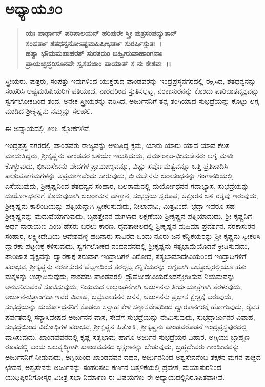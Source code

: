 \section*{ಅಧ್ಯಾಯ\enginline{-}೨೦}

\begin{verse}
\textbf{ಯಃ ಪಾರ್ಥಾನ್ ಪರಿಪಾಲಯನ್ ಹರಿಪುರೇ ಸ್ತ್ರೀ ಪುತ್ರಸಂಪದ್ಯುತಾನ್}\\\textbf{ಸಂಹರ್ತಾ ಶತಧನ್ವನೋಽಷ್ಟಮಹಿಷೀಭರ್ತಾ ಸುರರ್ಷಿಸ್ತುತಃ~।}\\\textbf{ಹತ್ವಾ ಭೌಮಮಪಾಹರತ್ ಸುರತರುಂ ಬಹ್ವೀರುವಾಹಾಂಗನಾಃ }\\\textbf{ಪ್ರಾಯಚ್ಛದ್ಧರಿಸೂನವೇ ಸ್ವಸಹಜಾಂ ಪಾಯಾತ್ ಸ ನಃ ಕೇಶವಃ~।।}
\end{verse}

 ಸ್ತ್ರೀಯರು, ಪುತ್ರರು, ಸಂಪತ್ತು ಇವುಗಳಿಂದ ಯುಕ್ತರಾದ ಪಾಂಡವರನ್ನು ಇಂದ್ರಪ್ರಸ್ಥನಗರದಲ್ಲಿ ರಕ್ಷಿಸಿದ, ಶತಧನ್ವನನ್ನು ಸಂಹರಿಸಿ ಅಷ್ಟಮಹಿಷಿಯರಿಗೆ ಪತಿಯಾದ, ನಾರದರಿಂದ ಸ್ತುತಿಸಲ್ಪಟ್ಟ, ನರಕಾಸುರನನ್ನು ಕೊಂದು ಪಾರಿಜಾತವೃಕ್ಷವನ್ನು ಸ್ವರ್ಗಲೋಕದಿಂದ ತಂದ, ಅನೇಕ ಸ್ತ್ರೀಯರನ್ನು ವರಿಸಿದ, ಅರ್ಜುನನಿಗೆ ತನ್ನ ತಂಗಿಯಾದ ಸುಭದ್ರೆಯನ್ನು ಕೊಟ್ಟು ಲಗ್ನ ಮಾಡಿದ ಶ‍್ರೀಕೃಷ್ಣನು ನಮ್ಮನ್ನು ಸಲಹಲಿ.

ಈ ಅಧ್ಯಾಯದಲ್ಲಿ ೨೪೬ ಶ್ಲೋಕಗಳಿವೆ.

ಇಂದ್ರಪ್ರಸ್ಥ ನಗರದಲ್ಲಿ ಪಾಂಡವರು ರಾಜ್ಯವನ್ನು ಆಳುತ್ತಿದ್ದ ಕ್ರಮ, ಯಾರು ಯಾರು ಯಾವ ಯಾವ ಕೆಲಸ ಮಾಡುತ್ತಿದ್ದರು, ಶ‍್ರೀಕೃಷ್ಣನು ಪಾಂಡವರ ಬಳಿಯೇ ಇರುತ್ತಿದುದು, ಧರ್ಮರಾಜ-ಭೀಮಸೇನರು ಲಗ್ನ ಮಾಡಿ ಕೊಳ್ಳುವುದು, ಭೀಮಸೇನನು ವೇದಗಳ ಪ್ರಾಮಾಣ್ಯವನ್ನೂ, ವಿಷ್ಣು ಸರ್ವೊಮತ್ವವನ್ನೂ ಒತ್ತಿ ಪ್ರತಿಪಾದಿಸಿ ಪಾಶುಪತಾಗಮಗಳನ್ನು ಅಪ್ರಮಾಣವೆಂದು ಸಾರುವುದು, ಭೀಮಸೇನನು ಜರಾಸಂಧನನ್ನು ಗಂಗಾನದಿಯಲ್ಲಿ ಎಸೆಯುವುದು, ಶ‍್ರೀಕೃಷ್ಣನಿಂದ ಶತಧನ್ವನ ಸಂಹಾರ, ಬಲರಾಮನಲ್ಲಿ ದುರ್ಯೋಧನನ ಗದಾಭ್ಯಾಸ, ಸುಭದ್ರೆಯನ್ನು ದುರ್ಯೋಧನನಿಗೆ ಕೊಡುವುದಾಗಿ ಬಲರಾಮನ ವಾಗ್ದಾನ, ಸುಭದ್ರೆಯ ಸ್ವರೂಪ, ಅಕ್ರೂರನ ಬಳಿ ರತ್ನವು ಇರುವುದು, ಶ‍್ರೀಕೃಷ್ಣನು ಕಾಲಿಂದಿಯನ್ನು ಪತ್ನಿಯನ್ನಾಗಿ ಸ್ವೀಕರಿಸುವುದು, ನೀಲಾದೇವಿ, ಮಿತ್ರವಿಂದೆ, ಭದ್ರಾ-ಇವರೂ ಸಹ ಶ‍್ರೀಕೃಷ್ಣನನ್ನು ಮದುವೆಯಾಗುವುದು, ಬೃಹತ್ತೇನನ ಮಗಳಾದ ಲಕ್ಷಣೆಯು ಶ‍್ರೀಕೃಷ್ಣನ ಪತ್ನಿಯಾದುದು, ಶ‍್ರೀ ಕೃಷ್ಣನಿಗೆ ಅರ್ಧ ನಾರಾಯಣ ಎಂಬ ಹೆಸರು ಬರಲು ಕಾರಣ, ರೈವತಾಚಲದಲ್ಲಿ ಶ‍್ರೀಕೃಷ್ಣನ ಮಹಿಮಾ ಪ್ರದರ್ಶನ, ನರಕಾಸುರನ ಸಂಹಾರ, ಲಕ್ಷ್ಮೀದೇವಿಯ ಆವೇಶವುಳ್ಳ ಹದಿನಾರು ಸಾವಿರದ ಒಂದು ನೂರು ಜನ ಕನ್ನಿಕೆಯರನ್ನು ಶ‍್ರೀ ಕೃಷ್ಣನು ಸ್ವೀಕರಿಸಿ ದ್ವಾರಕಾ ಪಟ್ಟಣಕ್ಕೆ ಕಳಿಸುವುದು, ಸ್ವರ್ಗಲೋಕದ ನಂದನವನದಲ್ಲಿ ಶ‍್ರೀಕೃಷ್ಣನು ಸತ್ಯಭಾಮೆಯೊಡನೆ ಕ್ರೀಡಿಸುವುದು, ಪಾರಿಜಾತ ವೃಕ್ಷವನ್ನು ದ್ವಾರಕಾಕ್ಕೆ ತರುವಾಗ ಇಂದ್ರಾದಿಗಳ ವಿರೋಧ, ಸತ್ಯಭಾಮಾದೇವಿಯರಿಂದ ಇಂದ್ರಾದಿಗಳಿಗೆ ಪರಾಭವ, ಶ‍್ರೀಕೃಷ್ಣನು ನರಕಾಸುರನ ಪಟ್ಟಣದಿಂದ ತರಲ್ಪಟ್ಟ ಕನ್ನಿಕೆಯರನ್ನು ಲಗ್ನವಾಗಿ ಒಬ್ಬೊಬ್ಬರಲ್ಲಿಯೂ ಹತ್ತು ಮಕ್ಕಳನ್ನು ಉತ್ಪಾದಿಸುವುದು, ನಾರದರು ಪಾಂಡವರಲ್ಲಿ ದ್ರೌಪದೀದೇವಿಯರೊಡನೆ\break ಕ್ರೀಡಿಸುವ ನಿಯಮವನ್ನು ಅನುಸರಿಸುವಂತೆ ಸೂಚಿಸುವುದು, ನಿಯಮದ ಉಲ್ಲಂಘನೆಗಾಗಿ ಅರ್ಜುನನು ತೀರ್ಥಯಾತ್ರೆಗಾಗಿ ತೆರಳುವುದು, ಅರ್ಜುನ-ಚಿತ್ರಾಂಗದಾ ಇವರ ವಿವಾಹ, ಬಭ್ರುವಾಹನನ ಜನನ, ಅರ್ಜುನನು ಪ್ರಭಾಸ ಕ್ಷೇತ್ರಕ್ಕೆ ಬರುವುದು, ಸುಭದ್ರೆಯನ್ನು ದುರ್ಯೋಧನನಿಗೆ ಕೊಡಲು ಸನ್ನಾಹ ಕೇಳಿ ಸನ್ಯಾಸವೇಷದಿಂದ ದ್ವಾರಕಾನಗರಕ್ಕೆ ಹೋಗುವುದು, ರೈವತ ಪರ್ವತದಲ್ಲಿ ಸನ್ಯಾಸಿವೇಷದ ಅರ್ಜುನನ ವಾಸ, ಸೇವೆಗೆ ಸುಭದ್ರೆಯನ್ನು ನೇಮಿಸುವುದು, ಸುಭದ್ರಾರ್ಜುನರ ವಿವಾಹ, ಸುಭದ್ರೆಯಿಂದ ವಿರೋಧಿಗಳ ಪರಾಭವ, ಶ‍್ರೀಕೃಷ್ಣನ ಹಿತೋಕ್ತಿ, ಶ‍್ರೀಕೃಷ್ಣನು ಪಾಂಡವರೊಡನೆ ಇಂದ್ರಪ್ರಸ್ಥಪುರದಲ್ಲಿ ವಾಸಿಸುವುದು, ಖಾಂಡವವನದಲ್ಲಿ ಕೃಷ್ಣ-ಸತ್ಯಭಾಮೆ ಹಾಗೂ ಅರ್ಜುನ-ಸುಭದ್ರೆಯರ ವಿಹಾರ, ಅಗ್ನಿಯು ಬ್ರಾಹ್ಮಣ ರೂಪದಲ್ಲಿ ಬಂದು ಬಲವೃದ್ಧಿಗಾಗಿ ಖಾಂಡವವನದ ಭಕ್ಷಣನನ್ನು ಬೇಡುವುದು, ಬ್ರಹ್ಮದೇವರು ಗಾಂಡೀವವನ್ನು ಅರ್ಜುನನಿಗೆ ನೀಡುವುದು, ಅಗ್ನಿಯಿಂದ ಖಾಂಡವವನ ದಹನ, ಅರ್ಜುನನಿಂದ ಅಶ್ವಸೇನನೆಂಬ ತಕ್ಷಕನ ಮಗನ ಪುಚ್ಛದ ಛೇದನ, ಅಶ್ವಸೇನನು ಅರ್ಜುನನ್ನು ಸಂಹರಿಸಲು ಕರ್ಣನ ಬತ್ತಳಿಕೆಯಲ್ಲಿ ಪ್ರವೇಶ, ಮಯಾಸುರನಿಂದ ಯುಧಿಷ್ಠಿರನಿಗೋಸ್ಕರ ವಿಚಿತ್ರ ಸಭಾ ನಿಮಾ೯ಣ ಈ ವಿಷಯಗಳು ಈ ಅಧ್ಯಾಯದಲ್ಲಿ\break ನಿರೂಪಿತವಾಗಿವೆ.


